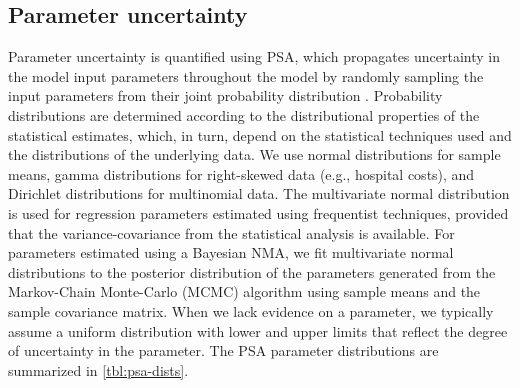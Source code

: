 \documentclass[11pt,final,fleqn]{article}\usepackage[]{graphicx}\usepackage[]{color}
\theoremstyle{plain}
\begin{document}
\subsection{Parameter uncertainty}\label{parameter-uncertainty}
Parameter uncertainty is quantified using PSA, which propagates uncertainty in the model input parameters throughout the model by randomly sampling the input parameters from their joint probability distribution \citep{baio2015probabilistic, claxton2005probabilistic}. Probability distributions are determined according to the distributional properties of the statistical estimates, which, in turn, depend on the statistical techniques used and the distributions of the underlying data. We use normal distributions for sample means, gamma distributions for right-skewed data (e.g., hospital costs), and Dirichlet distributions for multinomial data. The multivariate normal distribution is used for regression parameters estimated using frequentist techniques, provided that the variance-covariance from the statistical analysis is available. For parameters estimated using a Bayesian NMA, we fit multivariate normal distributions to the posterior distribution of the parameters generated from the Markov-Chain Monte-Carlo (MCMC) algorithm using sample means and the sample covariance matrix. When we lack evidence on a parameter, we typically assume a uniform distribution with lower and upper limits that reflect the degree of uncertainty in the parameter. The PSA parameter distributions are summarized in \autoref{tbl:psa-dists}. 
\end{document}
